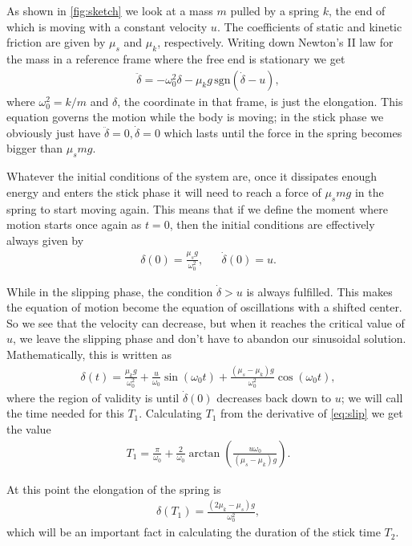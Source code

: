 \documentclass[10pt,a4paper,twocolumn]{article}
\begin{document}
As shown in \cref{fig:sketch} we look at a mass $m$ pulled by a spring $k$, the end of which is moving with a constant velocity $u$. The coefficients of static and kinetic friction are given by $\mu_s$ and $\mu_k$, respectively. Writing down Newton's II law for the mass in a reference frame where the free end is stationary we get
%
\begin{align}
    \ddot{\delta}= -\omega_0^2 \delta - \mu_k g \,\mathrm{sgn}(\dot{\delta} - u),
\end{align}
%
where $\omega_0^2 = k/m$ and $\delta$, the coordinate in that frame, is just the elongation. This equation governs the motion while the body is moving; in the stick phase we obviously just have $\ddot{\delta}=0, \dot{\delta} = 0$ which lasts until the force in the spring becomes bigger than $\mu_s m g$.

Whatever the initial conditions of the system are, once it dissipates enough energy and enters the stick phase it will need to reach a force of $\mu_s m g$ in the spring to start moving again. This means that if we define the moment where motion starts once again as $t=0$, then the initial conditions are effectively always given by
%
\begin{align}
    &\delta(0) = \frac{\mu_s g}{\omega_0^2},& &\dot{\delta}(0) = u.&
\end{align}

While in the slipping phase, the condition $\dot{\delta} > u$ is always fulfilled. This makes the equation of motion become the equation of oscillations with a shifted center. So we see that the velocity can decrease, but when it reaches the critical value of $u$, we leave the slipping phase and don't have to abandon our sinusoidal solution. Mathematically, this is written as
%
\begin{align}\label{eq:slip}
    \delta(t) = \frac{\mu_k g}{\omega_0^2} + \frac{u}{\omega_0} \sin(\omega_0 t) + \frac{(\mu_s - \mu_k) g}{\omega_0^2} \cos(\omega_0 t),
\end{align}
%
where the region of validity is until $\dot{\delta}(0)$ decreases back down to $u$; we will call the time needed for this $T_1$. Calculating $T_1$ from the derivative of \cref{eq:slip} we get the value
%
\begin{align}
    T_1 = \frac{\pi}{\omega_0} + \frac{2}{\omega_0} \arctan \left( \frac{u \omega_0}{(\mu_s - \mu_k) g} \right).
\end{align}

At this point the elongation of the spring is
%
\begin{align}\label{eq:elo_T1}
    \delta(T_1) = \frac{(2\mu_k - \mu_s) g}{\omega_0^2},
\end{align}
%
which will be an important fact in calculating the duration of the stick time $T_2$.
\end{document}
